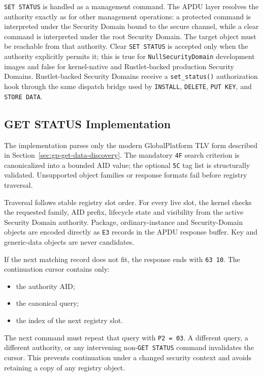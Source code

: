 \texttt{SET STATUS} is handled as a management command. The APDU layer resolves
the authority exactly as for other management operations: a protected command is
interpreted under the Security Domain bound to the secure channel, while a
clear command is interpreted under the root Security Domain. The target object
must be reachable from that authority. Clear \texttt{SET STATUS} is accepted
only when the authority explicitly permits it; this is true for
\texttt{NullSecurityDomain} development images and false for kernel-native and
Rustlet-backed production Security Domains. Rustlet-backed Security Domains
receive a \texttt{set\_status()} authorization hook through the same dispatch
bridge used by \texttt{INSTALL}, \texttt{DELETE}, \texttt{PUT KEY}, and
\texttt{STORE DATA}.

\subsection{GET STATUS Implementation}
\label{sec:impl-get-status}

The implementation parses only the modern GlobalPlatform TLV form described
in Section~\ref{sec:gp-get-data-discovery}. The mandatory \texttt{4F} search
criterion is canonicalized into a bounded AID value; the optional \texttt{5C}
tag list is structurally validated. Unsupported object families or response
formats fail before registry traversal.

Traversal follows stable registry slot order. For every live slot, the kernel
checks the requested family, AID prefix, lifecycle state and visibility from
the active Security Domain authority. Package, ordinary-instance and
Security-Domain objects are encoded directly as \texttt{E3} records in the
APDU response buffer. Key and generic-data objects are never candidates.

If the next matching record does not fit, the response ends with
\texttt{63 10}. The continuation cursor contains only:

\begin{itemize}
\item the authority AID;
\item the canonical query;
\item the index of the next registry slot.
\end{itemize}

The next command must repeat that query with \texttt{P2 = 03}. A different
query, a different authority, or any intervening non-\texttt{GET STATUS}
command invalidates the cursor. This prevents continuation under a changed
security context and avoids retaining a copy of any registry object.

